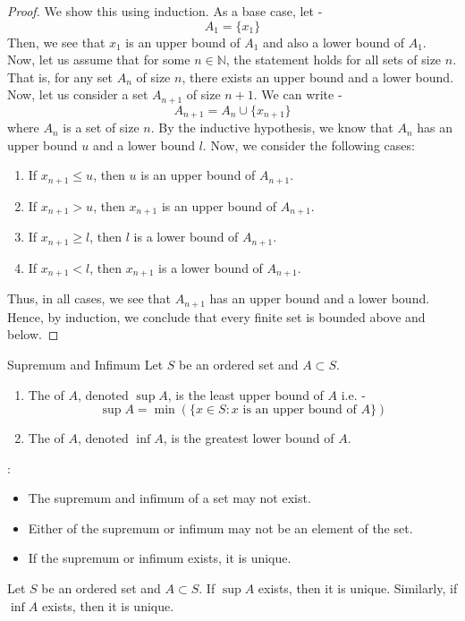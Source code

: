 \documentclass[openany]{book}
\begin{document}
\begin{proof}
We show this using induction. As a base case, let - 
$$A_1 = \{x_1\}$$
Then, we see that $x_1$ is an upper bound of $A_1$ and also a lower bound of $A_1$. Now, let us assume that for some $n \in \mathbb{N}$, the statement holds for all sets of size $n$. That is, for any set $A_n$ of size $n$, there exists an upper bound and a lower bound. Now, let us consider a set $A_{n+1}$ of size $n+1$. We can write -
$$A_{n+1} = A_n \cup \{x_{n+1}\}$$
where $A_n$ is a set of size $n$. By the inductive hypothesis, we know that $A_n$ has an upper bound $u$ and a lower bound $l$. Now, we consider the following cases: 
\begin{enumerate}
    \item If $x_{n+1} \leq u$, then $u$ is an upper bound of $A_{n+1}$.
    \item If $x_{n+1} > u$, then $x_{n+1}$ is an upper bound of $A_{n+1}$.
    \item If $x_{n+1} \geq l$, then $l$ is a lower bound of $A_{n+1}$.
    \item If $x_{n+1} < l$, then $x_{n+1}$ is a lower bound of $A_{n+1}$.
\end{enumerate}
Thus, in all cases, we see that $A_{n+1}$ has an upper bound and a lower bound. Hence, by induction, we conclude that every finite set is bounded above and below. 
\end{proof}
\begin{mydefinition}{Supremum and Infimum}
    Let $S$ be an ordered set and $A \subset S$.
    \begin{enumerate}
        \item The  of $A$, denoted $\sup A$, is the least upper bound of $A$ i.e. - 
        $$\sup A = \min ( \{x \in S : x \text{ is an upper bound of } A \} )$$
        \item The  of $A$, denoted $\inf A$, is the greatest lower bound of $A$.
    \end{enumerate}
\end{mydefinition}
: 
\begin{itemize}
    \item The supremum and infimum of a set may not exist. 
    \item Either of the supremum or infimum may not be an element of the set.
    \item If the supremum or infimum exists, it is unique.
\end{itemize}
\begin{mytheorem}
    Let $S$ be an ordered set and $A \subset S$. If $\sup A$ exists, then it is unique. Similarly, if $\inf A$ exists, then it is unique.
\end{mytheorem}
\end{document}
